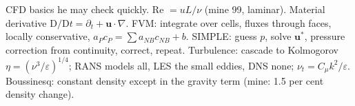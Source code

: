 \begin{qabox}[Pirker]{\pred CFD basics he may check quickly.}
\ans \textsf{Re} $=uL/\nu$ (mine 99, laminar). \textsf{Material derivative} $\mathrm{D}/\mathrm{D}t=\partial_t+\mathbf{u}\cdot\nabla$.
\textsf{FVM}: integrate over cells, fluxes through faces, locally conservative, $a_Pc_P=\sum a_{NB}c_{NB}+b$.
\textsf{SIMPLE}: guess $p$, solve $\mathbf{u}^*$, pressure correction from continuity, correct, repeat.
\textsf{Turbulence}: cascade to Kolmogorov $\eta=(\nu^3/\varepsilon)^{1/4}$; RANS models all, LES the
small eddies, DNS none; $\nu_t=C_\mu k^2/\varepsilon$. \textsf{Boussinesq}: constant density except in
the gravity term (mine: 1.5 per cent density change).
\end{qabox}
